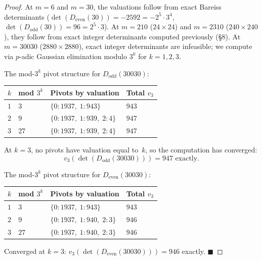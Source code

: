\documentclass[11pt,letterpaper]{article}
\theoremstyle{definition}
\begin{document}
\begin{proof}
\begin{sloppypar}
At $m = 6$ and $m = 30$, the valuations follow from exact Bareiss determinants ($\det(D_{\text{even}}(30)) = -2592 = -2^5 \cdot 3^4$, $\det(D_{\text{odd}}(30)) = 96 = 2^5 \cdot 3$). At $m = 210$ ($24 \times 24$) and $m = 2310$ ($240 \times 240$), they follow from exact integer determinants computed previously (\S8). At $m = 30030$ ($2880 \times 2880$), exact integer determinants are infeasible; we compute via $p$-adic Gaussian elimination modulo $3^k$ for $k = 1, 2, 3$.
\end{sloppypar}

The mod-$3^k$ pivot structure for $D_{\text{odd}}(30030)$:

\begin{center}
\begin{tabular}{@{}llll@{}}
\toprule
$k$ & mod $3^k$ & Pivots by valuation & Total $v_3$ \\
\midrule
$1$ & $3$  & $\{0\!:\!1937,\; 1\!:\!943\}$          & $943$ \\
$2$ & $9$  & $\{0\!:\!1937,\; 1\!:\!939,\; 2\!:\!4\}$ & $947$ \\
$3$ & $27$ & $\{0\!:\!1937,\; 1\!:\!939,\; 2\!:\!4\}$ & $947$ \\
\bottomrule
\end{tabular}
\end{center}

At $k = 3$, no pivots have valuation equal to~$k$, so the computation has converged:
\[
v_3(\det(D_{\text{odd}}(30030))) = 947 \text{ exactly.}
\]

The mod-$3^k$ pivot structure for $D_{\text{even}}(30030)$:

\begin{center}
\begin{tabular}{@{}llll@{}}
\toprule
$k$ & mod $3^k$ & Pivots by valuation & Total $v_3$ \\
\midrule
$1$ & $3$  & $\{0\!:\!1937,\; 1\!:\!943\}$          & $943$ \\
$2$ & $9$  & $\{0\!:\!1937,\; 1\!:\!940,\; 2\!:\!3\}$ & $946$ \\
$3$ & $27$ & $\{0\!:\!1937,\; 1\!:\!940,\; 2\!:\!3\}$ & $946$ \\
\bottomrule
\end{tabular}
\end{center}

Converged at $k = 3$: $v_3(\det(D_{\text{even}}(30030))) = 946$ exactly. $\blacksquare$
\end{proof}
\end{document}
